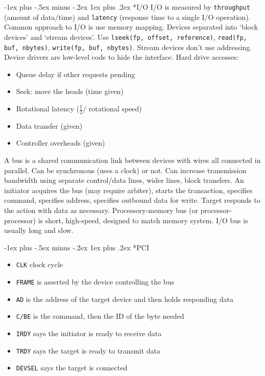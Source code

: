 \documentclass[landscape,10pt]{article}
\makeatletter
\renewcommand{\subsubsection}{\@startsection{subsubsection}{3}{0mm}%
            {-1ex plus -.5ex minus -.2ex}%
            {1ex plus .2ex}%
            {\normalfont\small\bfseries}}
\newcommand{\code}[1]{\texttt{#1}}
\makeatother
\begin{document}
\begin{multicols}{4}
\subsubsection*{I/O} I/O is measured by \code{throughput} (amount of data/time) and \code{latency} (response time to a single I/O operation). Common approach to I/O is use memory mapping. Devices separated into `block devices' and `stream devices'. Use \code{lseek(fp, offset, reference)}, \code{read(fp, buf, nbytes)}, \code{write(fp, buf, nbytes)}. Stream devices don't use addressing. Device drivers are low-level code to hide the interface. Hard drive accesses:
\begin{itemize}
    \item[] Queue delay if other requests pending
    \item[] Seek: move the heads (time given)
    \item[] Rotational latency (\(\tfrac{1}{2} / \) rotational speed)
    \item[] Data transfer (given)
    \item[] Controller overheads (given)
\end{itemize}
A bus is a shared communication link between devices with wires all connected in parallel. Can be synchronous (uses a clock) or not. Can increase transmission bandwidth using separate control/data lines, wider lines, block transfers. An initiator acquires the bus (may require arbiter), starts the transaction, specifies command, specifies address, specifies outbound data for write. Target responds to the action with data as necessary. Processory-memory bus (or processor-processor) is short, high-speed, designed to match memory system. I/O bus is usually long and slow.

\subsubsection*{PCI} 
\begin{itemize}
    \item[] \code{CLK} clock cycle
    \item[] \code{FRAME} is asserted by the device controlling the bus
    \item[] \code{AD} is the address of the target device and then holds responding data
    \item[] \code{C/BE} is the command, then the ID of the byte needed
    \item[] \code{IRDY} says the initiator is ready to receive data
    \item[] \code{TRDY} says the target is ready to transmit data
    \item[] \code{DEVSEL} says the target is connected
\end{itemize}


\end{multicols}
\end{document}
